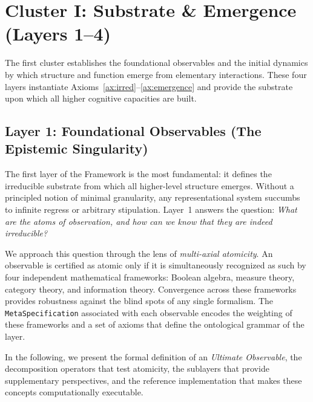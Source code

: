 \section{Cluster I: Substrate \& Emergence (Layers 1--4)}
\label{sec:cluster1}

The first cluster establishes the foundational observables and the initial dynamics by which structure and function emerge from elementary interactions. These four layers instantiate Axioms~\ref{ax:irred}--\ref{ax:emergence} and provide the substrate upon which all higher cognitive capacities are built.

\subsection{Layer 1: Foundational Observables (The Epistemic Singularity)}
\label{subsec:layer1}

The first layer of the \Apeiron{} Framework is the most fundamental: it defines the irreducible substrate from which all higher-level structure emerges. Without a principled notion of minimal granularity, any representational system succumbs to infinite regress or arbitrary stipulation. Layer~1 answers the question: \emph{What are the atoms of observation, and how can we know that they are indeed irreducible?}

We approach this question through the lens of \emph{multi-axial atomicity}. An observable is certified as atomic only if it is simultaneously recognized as such by four independent mathematical frameworks: Boolean algebra, measure theory, category theory, and information theory. Convergence across these frameworks provides robustness against the blind spots of any single formalism. The \texttt{MetaSpecification} associated with each observable encodes the weighting of these frameworks and a set of axioms that define the ontological grammar of the layer.

In the following, we present the formal definition of an \textit{Ultimate Observable}, the decomposition operators that test atomicity, the sublayers that provide supplementary perspectives, and the reference implementation that makes these concepts computationally executable.


